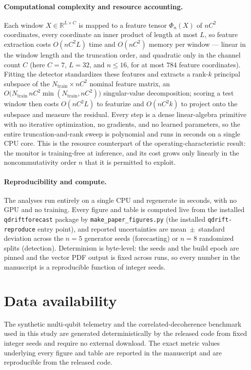 \documentclass[
  aps,
  prresearch,
  reprint,
  amsmath,
  amssymb,
  nofootinbib,
  floatfix,
]{revtex4-2}
\begin{document}
\paragraph{Computational complexity and resource accounting.}
Each window $X\in\mathbb{R}^{L\times C}$ is mapped to a feature tensor $\Phi_n(X)$ of
$nC^2$ coordinates, every coordinate an inner product of length at most $L$, so
feature extraction costs $O(nC^2 L)$ time and $O(nC^2)$ memory per window --- linear
in the window length and the truncation order, and quadratic only in the channel
count $C$ (here $C{=}7$, $L{=}32$, and $n\le16$, for at most $784$ feature
coordinates). Fitting the detector standardizes these features and extracts a
rank-$k$ principal subspace of the $N_{\mathrm{train}}\times nC^2$ nominal feature
matrix, an
$O\!\big(N_{\mathrm{train}}\,nC^2\min(N_{\mathrm{train}},nC^2)\big)$ singular-value
decomposition; scoring a test window then costs $O(nC^2 L)$ to featurize and
$O(nC^2 k)$ to project onto the subspace and measure the residual. Every step is a
dense linear-algebra primitive with no iterative optimization, no gradients, and no
learned parameters, so the entire truncation-and-rank sweep is polynomial and runs in
seconds on a single CPU core. This is the resource counterpart of the
operating-characteristic result: the monitor is training-free at inference, and its
cost grows only linearly in the noncommutativity order $n$ that it is permitted to
exploit.

\paragraph{Reproducibility and compute.}
The analyses run entirely on a single CPU and regenerate in seconds, with no GPU and
no training. Every figure and table is computed live from the installed
\texttt{qdriftforecast} package by \texttt{make\_paper\_figures.py} (the installed
\texttt{qdrift-reproduce} entry point), and reported uncertainties are
mean~$\pm$~standard deviation across the $n=5$ generator seeds (forecasting) or $n=8$
randomized splits (detection). Determinism is byte-level: the seeds and the build
epoch are pinned and the vector PDF output is fixed across runs, so every number in
the manuscript is a reproducible function of integer seeds.

\section*{Data availability}
The synthetic multi-qubit telemetry and the correlated-decoherence benchmark used in
this study are generated deterministically by the released code from fixed integer
seeds and require no external download. The exact metric values underlying every
figure and table are reported in the manuscript and are reproducible from the
released code.
\end{document}
